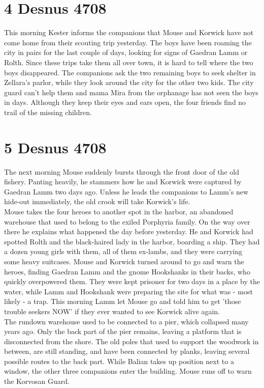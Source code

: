 \section{4 Desnus 4708}

This morning Kester informs the companions that Mouse and Korwick have not come home from their scouting trip yesterday. The boys have been roaming the city in pairs for the last couple of days, looking for signs of Gaedran Lamm or Rolth. Since these trips take them all over town, it is hard to tell where the two boys disappeared. The companions ask the two remaining boys to seek shelter in Zellara's parlor, while they look around the city for the other two kids. The city guard can't help them and mama Mira from the orphanage has not seen the boys in days. Although they keep their eyes and ears open, the four friends find no trail of the missing children.\\

\section{5 Desnus 4708}

The next morning Mouse suddenly bursts through the front door of the old fishery. Panting heavily, he stammers how he and Korwick were captured by Gaedran Lamm two days ago. Unless he leads the companions to Lamm's new hide-out immediately, the old crook will take Korwick's life.\\

Mouse takes the four heroes to another spot in the harbor, an abandoned warehouse that used to belong to the exiled Porphyria family. On the way over there he explains what happened the day before yesterday. He and Korwick had spotted Rolth and the black-haired lady in the harbor, boarding a ship. They had a dozen young girls with them, all of them ex-lambs, and they were carrying some heavy suitcases. Mouse and Korwick turned around to go and warn the heroes, finding Gaedran Lamm and the gnome Hookshanks in their backs, who quickly overpowered them. They were kept prisoner for two days in a place by the water, while Lamm and Hookshank were preparing the site for what was - most likely - a trap. This morning Lamm let Mouse go and told him to get 'those trouble seekers NOW' if they ever wanted to see Korwick alive again.\\

The rundown warehouse used to be connected to a pier, which collapsed many years ago. Only the back part of the pier remains, leaving a platform that is disconnected from the shore. The old poles that used to support the woodwork in between, are still standing, and have been connected by planks, leaving several possible routes to the back part. While Balian takes up position next to a window, the other three companions enter the building. Mouse runs off to warn the Korvosan Guard.\\

